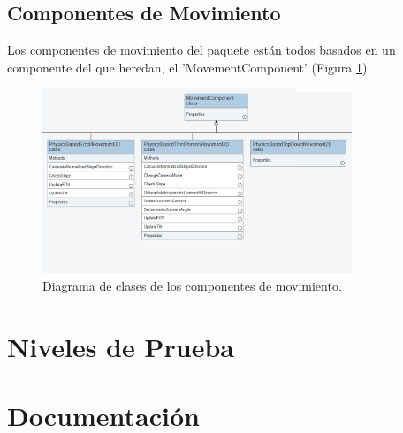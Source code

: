 \subsection{Componentes de Movimiento}
Los componentes de movimiento del paquete están todos basados en un componente del que heredan, el 'MovementComponent' (Figura \ref{fig:umlMovimiento}). 

\begin{figure}[H]
  \centering
    \includegraphics[width=350px,clip=true]{Movement.png}
  \caption{Diagrama de clases de los componentes de movimiento.}
  \label{fig:umlMovimiento}
\end{figure}

\section{Niveles de Prueba}


\section{Documentación}
